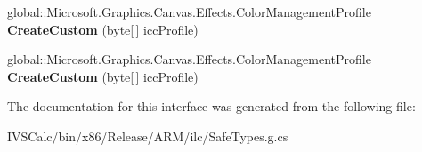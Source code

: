 \begin{DoxyCompactItemize}
global\+::\+Microsoft.\+Graphics.\+Canvas.\+Effects.\+Color\+Management\+Profile {\bfseries Create\+Custom} (byte\mbox{[}$\,$\mbox{]} icc\+Profile)
\item 
\mbox{\label{interface_microsoft_1_1_graphics_1_1_canvas_1_1_effects_1_1_i_color_management_profile_statics_ae1838f1529a841f6e2fa36000faebc5e}} 
global\+::\+Microsoft.\+Graphics.\+Canvas.\+Effects.\+Color\+Management\+Profile {\bfseries Create\+Custom} (byte\mbox{[}$\,$\mbox{]} icc\+Profile)
\end{DoxyCompactItemize}


The documentation for this interface was generated from the following file\+:\begin{DoxyCompactItemize}
\item 
I\+V\+S\+Calc/bin/x86/\+Release/\+A\+R\+M/ilc/Safe\+Types.\+g.\+cs\end{DoxyCompactItemize}
